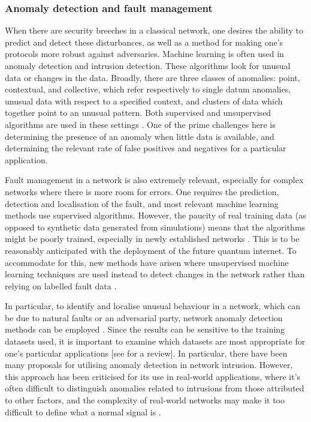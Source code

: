 \documentclass[twocolumn, aps, rmp, amsmath, amssymb, nofootinbib, superscriptaddress, longbibliography, floatfix, table-of-contents, eqsecnum]{revtex4}
\begin{document}
\subsubsection{Anomaly detection and fault management}

When there are security breeches in a classical network, one desires the ability to predict and detect these disturbances, as well as a method for making one's protocols more robust against adversaries. Machine learning is often used in anomaly detection and intrusion detection. These algorithms look for unusual data or changes in the data. Broadly, there are three classes of anomalies: point, contextual, and collective, which refer respectively to single datum anomalies, unusual data with respect to a specified context, and clusters of data which together point to an unusual pattern. Both supervised and unsupervised algorithms are used in these settings \cite{bib:thottan2003anomaly, bib:ahmed2007machine}. One of the prime challenges here is determining the presence of an anomaly when little data is available, and determining the relevant rate of false positives and negatives for a particular application.

Fault management in a network is also extremely relevant, especially for complex networks where there is more room for errors. One requires the prediction, detection and localisation of the fault, and most relevant machine learning methods use supervised algorithms. However, the paucity of real training data (as opposed to synthetic data generated from simulations) means that the algorithms might be poorly trained, especially in newly established networks \cite{bib:hood1997proactive, bib:kogeda2006prediction, bib:snow2005assessing}. This is to be reasonably anticipated with the deployment of the future quantum internet. To accommodate for this, new methods have arisen where unsupervised machine learning techniques are used instead to detect changes in the network rather than relying on labelled fault data \cite{bib:hajji2005statistical}.

In particular, to identify and localise unusual behaviour in a network, which can be due to natural faults or an adversarial party, network anomaly detection methods can be employed \cite{bib:ahmed2007machine, bib:fraley2017promise, bib:joseph2013machine}. Since the results can be sensitive to the training datasets used, it is important to examine which datasets are most appropriate for one's particular applications [see \cite{bib:yavanoglu2017review} for a review]. In particular, there have been many proposals for utilising anomaly detection in network intrusion. However, this approach has been criticised for its use in real-world applications, where it's often difficult to distinguish anomalies
related to intrusions from those attributed to other factors, and the complexity of real-world networks may make it too difficult to define what a normal signal is \cite{bib:sommer2010outside}.
\end{document}
